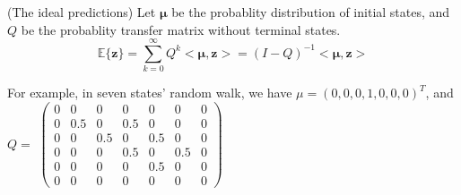 \begin{defn}
    (The ideal predictions)
    Let $\mathbf{\mu}$ be the probablity distribution of initial states,
    and $Q$ be the probablity transfer matrix without terminal states.
    \begin{equation}
        \mathbb{E}\{\mathbf{z}\} = 
            \sum^{\infty}_{k=0} Q^k<\mathbf{\mu}, \mathbf{z}> 
            = {(I-Q)}^{-1}<\mathbf{\mu}, \mathbf{z}>
    \end{equation}
\end{defn}
For example, in seven states' random walk, we have
$\mu = {(0, 0, 0, 1, 0, 0, 0)}^T$, and $Q = $
$
\begin{pmatrix}
    0& 0& 0& 0& 0& 0& 0\\
    0& 0.5& 0& 0.5& 0& 0& 0 \\ 
    0& 0& 0.5& 0& 0.5& 0& 0 \\
    0& 0& 0& 0.5& 0& 0.5& 0 \\
    0& 0& 0& 0& 0.5& 0& 0 \\
    0& 0& 0& 0& 0& 0& 0 
\end{pmatrix}
$

